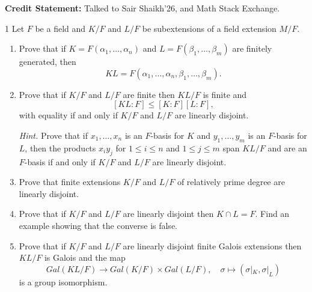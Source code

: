 \documentclass[12pt]{article}
\begin{document}



\textbf{Credit Statement:} Talked to Sair Shaikh'26, and Math Stack Exchange.
\vspace{.1in}

\begin{problem}{1}
    Let $F$ be a field and $K/F$ and $L/F$ be subextensions of a field extension $M/F$.

    \begin{enumerate}
        \item[(a)] Prove that if $K = F(\alpha_1, \dots, \alpha_n)$ and $L = F(\beta_1, \dots, \beta_m)$ are finitely generated, then
        \[
        KL = F(\alpha_1, \dots, \alpha_n, \beta_1, \dots, \beta_m).
        \]

        \item[(b)] Prove that if $K/F$ and $L/F$ are finite then $KL/F$ is finite and
        \[
        [KL : F] \le [K : F][L : F],
        \]
        with equality if and only if $K/F$ and $L/F$ are linearly disjoint.

        \textit{Hint.} Prove that if $x_1, \dots, x_n$ is an $F$-basis for $K$ and $y_1, \dots, y_m$ is an $F$-basis for $L$, then the products $x_i y_j$ for $1 \le i \le n$ and $1 \le j \le m$ span $KL/F$ and are an $F$-basis if and only if $K/F$ and $L/F$ are linearly disjoint.

        \item[(c)] Prove that finite extensions $K/F$ and $L/F$ of relatively prime degree are linearly disjoint.

        \item[(d)] Prove that if $K/F$ and $L/F$ are linearly disjoint then $K \cap L = F$. Find an example showing that the converse is false.

        \item[(e)] Prove that if $K/F$ and $L/F$ are linearly disjoint finite Galois extensions then $KL/F$ is Galois and the map
        \[
        Gal(KL/F) \to Gal(K/F) \times Gal(L/F),
        \quad
        \sigma \mapsto (\sigma|_K, \sigma|_L)
        \]
        is a group isomorphism.
    \end{enumerate}
\end{problem}
\end{document}
